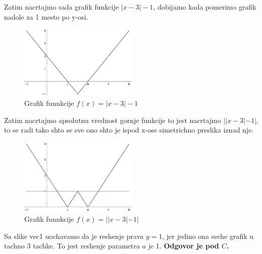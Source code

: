 \documentclass[a4paper,12pt]{article}
\begin{document}
\begin{enumerate}[1.]
\par Zatim nacrtajmo sada grafik funkcije $|x-3 | - 1$, dobijamo kada pomerimo grafik nadole za 1 mesto po y-osi.
\begin{figure}[h!]
\begin{center}
\includegraphics[width=0.5\textwidth]{sl3.eps}
\caption{Grafik funnkcije $f(x) = |x-3| -1$}
\end{center}
\end{figure}
\newpage
\par Zatim nacrtajmo apsolutnu vrednost gornje funkcije to jest nacrtajmo $||x-3 | - 1|$, to se radi tako shto se sve ono shto je ispod x-ose simetrichno preslika iznad nje.
\begin{figure}[h!]
\begin{center}
\includegraphics[width=0.5\textwidth]{sl4.eps}
\caption{Grafik funnkcije $f(x) =| |x-3| -1|$}
\end{center}
\end{figure}

\par Sa slike vec1 uochavamo da je reshenje prava $y = 1$, jer jedino ona seche grafik u tachno 3 tachke. To jest reshenje parametra $a$ je 1. \textbf{Odgovor je pod $C$.}


\end{enumerate}
\end{document}
